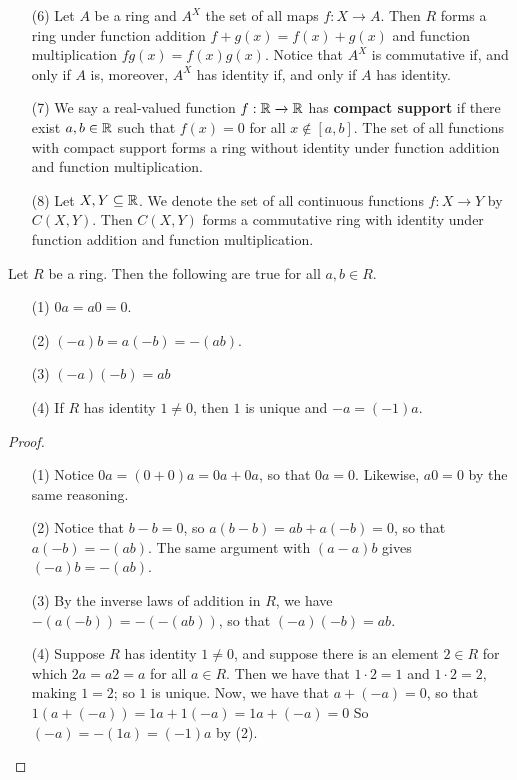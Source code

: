 \begin{example}
\begin{enumerate}
    \item[(6)] Let $A$ be a ring and $A^X$ the set of all maps $f:X \xrightarrow{}
      A$. Then $R$ forms a ring under function addition  $f+g(x)=f(x)+g(x)$ and
      function multiplication $fg(x)=f(x)g(x)$. Notice that $A^X$ is commutative if,
      and only if  $A$ is, moreover, $A^X$ has identity if, and only if  $A$ has
      identity.

    \item[(7)] We say a real-valued function $f:\mathbb{R} \xrightarrow{} \mathbb{R}$ has
      \textbf{compact support} if there exist $a,b \in \mathbb{R}$ such that $f(x)=0$
      for all $x \notin [a,b]$. The set of all functions with compact support
      forms a ring without identity under function addition and function
      multiplication.

    \item[(8)] Let $X,Y \subseteq \mathbb{R}$. We denote the set of all continuous
      functions  $f:X \xrightarrow{} Y$ by $C(X,Y)$. Then $C(X,Y)$ forms a
      commutative ring with identity under function addition and function
      multiplication.
  \end{enumerate}
\end{example}

\begin{proposition}\label{proposition_5.1.1}
  Let $R$ be a ring. Then the following are true for all  $a,b \in R$.
  \begin{enumerate}
    \item[(1)] $0a=a0=0$.

    \item[(2)] $(-a)b=a(-b)=-(ab)$.

    \item[(3)] $(-a)(-b)=ab$

    \item[(4)] If $R$ has identity  $1 \neq 0$, then $1$ is unique and
      $-a=(-1)a$.
  \end{enumerate}
\end{proposition}
\begin{proof}
  \begin{enumerate}
    \item[(1)] Notice $0a=(0+0)a=0a+0a$, so that $0a=0$. Likewise, $a0=0$ by
      the same reasoning.

    \item[(2)] Notice that $b-b=0$, so $a(b-b)=ab+a(-b)=0$, so that
      $a(-b)=-(ab)$. The same argument with $(a-a)b$ gives $(-a)b=-(ab)$.

    \item[(3)] By the inverse laws of addition in $R$, we have
      $-(a(-b))=-(-(ab))$, so that $(-a)(-b)=ab$.

    \item[(4)] Suppose $R$ has identity $1 \neq 0$, and suppose there is an
      element $2 \in R$ for which  $2a=a2=a$ for all $a \in R$. Then we have
      that $1 \cdot 2=1$ and  $1 \cdot 2=2$, making  $1=2$; so  $1$ is unique.
      Now, we have that $a+(-a)=0$, so that $1(a+(-a))=1a+1(-a)=1a+(-a)=0$ So
      $(-a)=-(1a)=(-1)a$ by (2).
  \end{enumerate}
\end{proof}

